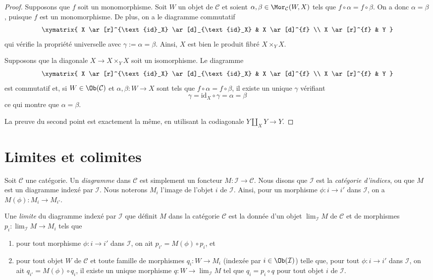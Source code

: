 \begin{proof}
Supposons que $f$ soit un monomorphisme. Soit $W$ un objet de $\mathcal C$
et soient $\alpha, \beta \in \Mor_\mathcal C(W,X)$ tels que
$f\circ \alpha = f\circ
\beta$. On a donc $\alpha = \beta$,
puisque $f$ est un monomorphisme. De plus, on a le diagramme commutatif
$$
\xymatrix{
X \ar[r]^{\text{id}_X} \ar[d]_{\text{id}_X} & X \ar[d]^{f} \\
X \ar[r]^{f} & Y
}
$$
qui vérifie la propriété universelle avec $\gamma := \alpha = \beta$.
Ainsi, $X$ est bien le produit fibré $X\times_Y X$.

\medskip\noindent
Supposons que la diagonale $X \to X \times_Y X$ soit un isomorphisme.
Le diagramme
$$
\xymatrix{
X \ar[r]^{\text{id}_X} \ar[d]_{\text{id}_X} & X \ar[d]^{f} \\
X \ar[r]^{f} & Y }
$$
est commutatif et, si $W \in \Ob(\mathcal C)$ et
$\alpha, \beta : W \to X$ sont tels que
$f \circ \alpha = f \circ \beta$, il existe un unique
$\gamma$ vérifiant
$$
\gamma = \text{id}_X\circ\gamma = \alpha = \beta
$$
ce qui montre que $\alpha = \beta$.

\medskip\noindent
La preuve du second point est exactement la même, en utilisant la codiagonale
$Y\amalg_X Y \to Y$.
\end{proof}





\section{Limites et colimites}
\label{section-limits}

\noindent
Soit $\mathcal{C}$ une catégorie. Un {\it diagramme} dans $\mathcal{C}$ est
simplement un foncteur $M : \mathcal{I} \to \mathcal{C}$. Nous disons que
$\mathcal{I}$ est la {\it catégorie d'indices}, ou que $M$ est un
diagramme indexé par $\mathcal{I}$. Nous noterons $M_i$ l'image de l'objet
$i$ de $\mathcal{I}$. Ainsi, pour un morphisme $\phi : i \to i'$
dans $\mathcal{I}$, on a $M(\phi) : M_i \to M_{i'}$.

\begin{definition}
\label{definition-limit}
Une {\it limite} du diagramme indexé par $\mathcal{I}$ que définit $M$ dans la
catégorie
$\mathcal{C}$ est la donnée d'un objet $\lim_\mathcal{I} M$ de $\mathcal{C}$
et de morphismes $p_i : \lim_\mathcal{I} M \to M_i$ tels que
\begin{enumerate}
\item pour tout morphisme $\phi : i \to i'$
dans $\mathcal{I}$, on ait $p_{i'} = M(\phi) \circ p_i$, et
\item pour tout objet $W$ de $\mathcal{C}$ et toute famille de
morphismes $q_i : W \to M_i$ (indexée par $i \in \Ob(\mathcal{I})$)
telle que, pour tout $\phi : i \to i'$
dans $\mathcal{I}$, on ait $q_{i'} = M(\phi) \circ q_i$, il existe
un unique morphisme $q : W \to \lim_\mathcal{I} M$ tel que
$q_i = p_i \circ q$ pour tout objet $i$ de $\mathcal{I}$.
\end{enumerate}
\end{definition}

